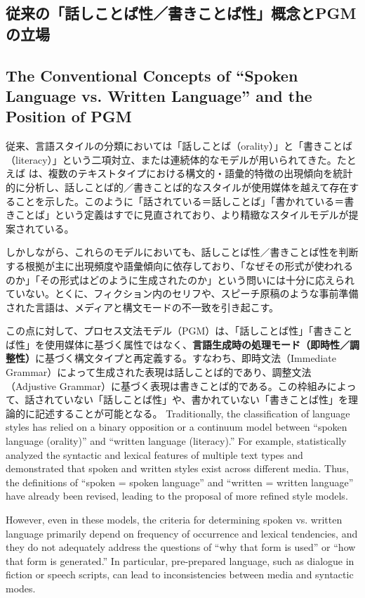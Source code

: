 \ifJPN
\subsection{従来の「話しことば性／書きことば性」概念とPGMの立場}
\else
\subsection{The Conventional Concepts of ``Spoken Language vs. Written Language'' and the Position of PGM}
\fi

\ifJPN
従来、言語スタイルの分類においては「話しことば（orality）」と「書きことば（literacy）」という二項対立、または連続体的なモデルが用いられてきた。たとえば \textcite{biber1988} は、複数のテキストタイプにおける構文的・語彙的特徴の出現傾向を統計的に分析し、話しことば的／書きことば的なスタイルが使用媒体を越えて存在することを示した。このように「話されている＝話しことば」「書かれている＝書きことば」という定義はすでに見直されており、より精緻なスタイルモデルが提案されている。

しかしながら、これらのモデルにおいても、話しことば性／書きことば性を判断する根拠が主に出現頻度や語彙傾向に依存しており、「なぜその形式が使われるのか」「その形式はどのように生成されたのか」という問いには十分に応えられていない。とくに、フィクション内のセリフや、スピーチ原稿のような事前準備された言語は、メディアと構文モードの不一致を引き起こす。

この点に対して、プロセス文法モデル（PGM）は、「話しことば性」「書きことば性」を使用媒体に基づく属性ではなく、\textbf{言語生成時の処理モード（即時性／調整性）}に基づく構文タイプと再定義する。すなわち、即時文法（Immediate Grammar）によって生成された表現は話しことば的であり、調整文法（Adjustive Grammar）に基づく表現は書きことば的である。この枠組みによって、話されていない「話しことば性」や、書かれていない「書きことば性」を理論的に記述することが可能となる。
\else
Traditionally, the classification of language styles has relied on a binary opposition or a continuum model between ``spoken language (orality)'' and ``written language (literacy).'' For example, \textcite{biber1988} statistically analyzed the syntactic and lexical features of multiple text types and demonstrated that spoken and written styles exist across different media. Thus, the definitions of ``spoken = spoken language'' and ``written = written language'' have already been revised, leading to the proposal of more refined style models.

However, even in these models, the criteria for determining spoken vs. written language primarily depend on frequency of occurrence and lexical tendencies, and they do not adequately address the questions of ``why that form is used'' or ``how that form is generated.'' In particular, pre-prepared language, such as dialogue in fiction or speech scripts, can lead to inconsistencies between media and syntactic modes.

